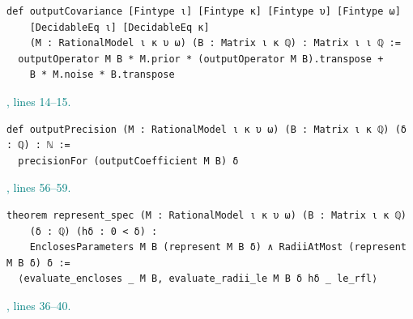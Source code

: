 \documentclass[11pt]{article}\usepackage{needspace}\renewcommand{\paperkind}{Lean companion}\setlength{\parskip}{0.35em}
\begin{document}
\begin{lstlisting}[style=BayesSource]
def outputCovariance [Fintype ι] [Fintype κ] [Fintype υ] [Fintype ω]
    [DecidableEq ι] [DecidableEq κ]
    (M : RationalModel ι κ υ ω) (B : Matrix ι κ ℚ) : Matrix ι ι ℚ :=
  outputOperator M B * M.prior * (outputOperator M B).transpose +
    B * M.noise * B.transpose
\end{lstlisting}



{\small\textcolor{teal}{, lines 14--15.}\par}

\begin{lstlisting}[style=BayesSource]
def outputPrecision (M : RationalModel ι κ υ ω) (B : Matrix ι κ ℚ) (δ : ℚ) : ℕ :=
  precisionFor (outputCoefficient M B) δ
\end{lstlisting}



{\small\textcolor{teal}{, lines 56--59.}\par}

\begin{lstlisting}[style=BayesSource]
theorem represent_spec (M : RationalModel ι κ υ ω) (B : Matrix ι κ ℚ)
    (δ : ℚ) (hδ : 0 < δ) :
    EnclosesParameters M B (represent M B δ) ∧ RadiiAtMost (represent M B δ) δ :=
  ⟨evaluate_encloses _ M B, evaluate_radii_le M B δ hδ _ le_rfl⟩
\end{lstlisting}



{\small\textcolor{teal}{, lines 36--40.}\par}
\end{document}
